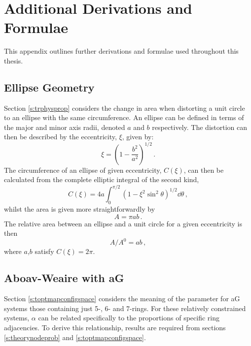 \chapter[Additional Derivations and Formulae]{Additional Derivations and \\ Formulae}
\label{app:derivations}

This appendix outlines further derivations and formulae used throughout this thesis.

\section{Ellipse Geometry}
\label{app:derivellipse}

Section \ref{s:trphysprop} considers the change in area when distorting a unit circle to an ellipse with the same circumference.
An ellipse can be defined in terms of the major and minor axis radii, denoted $a$ and $b$ respectively.
The distortion can then be described by the eccentricity, $\xi$, given by:
\begin{equation}
	\xi = \left(1-\frac{b^2}{a^2}\right)^{1/2}\,.
\end{equation}
The circumference of an ellipse of given eccentricity, $C\left(\xi\right)$, can then be calculated from the complete elliptic integral of the second kind,
\begin{equation}
	\label{eq:ellipsec}
	C\left(\xi\right) = 4a\int_0^{\pi/2} \left(1-\xi^2\sin^2\theta\right)^{1/2}\dd\theta\,,
\end{equation}
whilst the area is given more straightforwardly by
\begin{equation}
	A = \pi ab\,.
\end{equation}
The relative area between an ellipse and a unit circle for a given eccentricity is then
\begin{equation}
 	A/A^0=ab\,,
\end{equation} 
where $a$,$b$ satisfy $C\left(\xi\right)=2\pi$.

\section{Aboav\--Weaire with aG}
\label{app:derivag}

Section \ref{s:toptmapconfigspace} considers the meaning of the \aw{} parameter for aG systems \ie{} those containing just 5\--, 6\-- and 7\--rings.
For these relatively constrained systems, $\alpha$ can be related specifically to the proportions of specific ring adjacencies.
To derive this relationship, results are required from sections \ref{s:theorynodeprob} and \ref{s:toptmapconfigspace}.

